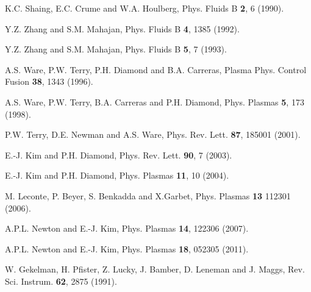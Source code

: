 \documentclass[aip,pop,amsmath,amssymb,preprint,superscriptaddress]{revtex4-1} %
\begin{document}
\begin{thebibliography}{10}
K.C. Shaing, E.C. Crume and W.A. Houlberg, Phys. Fluids B {\bf 2}, 6 (1990).

Y.Z. Zhang and S.M. Mahajan, Phys. Fluids B {\bf 4}, 1385 (1992).

Y.Z. Zhang and S.M. Mahajan, Phys. Fluids B {\bf 5}, 7 (1993).

A.S. Ware, P.W. Terry, P.H. Diamond and B.A. Carreras, Plasma Phys. Control Fusion {\bf 38},  1343  (1996).

A.S. Ware, P.W. Terry, B.A. Carreras and P.H. Diamond, Phys. Plasmas {\bf 5}, 173 (1998).

P.W. Terry, D.E. Newman and A.S. Ware, Phys. Rev. Lett. {\bf 87}, 185001  (2001).

E.-J. Kim and P.H. Diamond, Phys. Rev. Lett. {\bf 90}, 7 (2003).

E.-J. Kim and P.H. Diamond, Phys. Plasmas {\bf 11},  10  (2004).

M. Leconte, P. Beyer, S. Benkadda and X.Garbet, Phys. Plasmas {\bf 13} 112301 (2006).

A.P.L. Newton and E.-J. Kim, Phys. Plasmas {\bf 14}, 122306 (2007).

A.P.L. Newton and E.-J. Kim, Phys. Plasmas {\bf 18}, 052305 (2011).

W. Gekelman, H. Pfister, Z. Lucky, J. Bamber, D. Leneman and J. Maggs, Rev. Sci. Instrum. {\bf 62},  2875  (1991).










\end{thebibliography}
\end{document}
